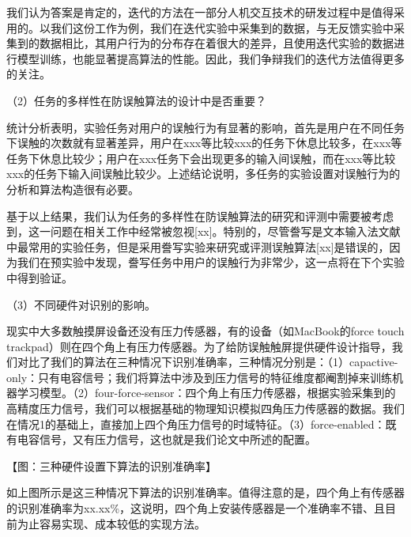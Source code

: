 我们认为答案是肯定的，迭代的方法在一部分人机交互技术的研发过程中是值得采用的。以我们这份工作为例，我们在迭代实验中采集到的数据，与无反馈实验中采集到的数据相比，其用户行为的分布存在着很大的差异，且使用迭代实验的数据进行模型训练，也能显著提高算法的性能。因此，我们争辩我们的迭代方法值得更多的关注。

（2）任务的多样性在防误触算法的设计中是否重要？

统计分析表明，实验任务对用户的误触行为有显著的影响，首先是用户在不同任务下误触的次数就有显著差异，用户在xxx等比较xxx的任务下休息比较多，在xxx等任务下休息比较少；用户在xxx任务下会出现更多的输入间误触，而在xxx等比较xxx的任务下输入间误触比较少。上述结论说明，多任务的实验设置对误触行为的分析和算法构造很有必要。

基于以上结果，我们认为任务的多样性在防误触算法的研究和评测中需要被考虑到，这一问题在相关工作中经常被忽视[xx]。特别的，尽管誊写是文本输入法文献中最常用的实验任务，但是采用誊写实验来研究或评测误触算法[xx]是错误的，因为我们在预实验中发现，誊写任务中用户的误触行为非常少，这一点将在下个实验中得到验证。

（3）不同硬件对识别的影响。

现实中大多数触摸屏设备还没有压力传感器，有的设备（如MacBook的force touch trackpad）则在四个角上有压力传感器。为了给防误触触屏提供硬件设计指导，我们对比了我们的算法在三种情况下识别准确率，三种情况分别是：（1）capactive-only：只有电容信号；我们将算法中涉及到压力信号的特征维度都阉割掉来训练机器学习模型。（2）four-force-sensor：四个角上有压力传感器，根据实验采集到的高精度压力信号，我们可以根据基础的物理知识模拟四角压力传感器的数据。我们在情况1的基础上，直接加上四个角压力信号的时域特征。（3）force-enabled：既有电容信号，又有压力信号，这也就是我们论文中所述的配置。

【图：三种硬件设置下算法的识别准确率】

如上图所示是这三种情况下算法的识别准确率。值得注意的是，四个角上有传感器的识别准确率为xx.xx\%，这说明，四个角上安装传感器是一个准确率不错、且目前为止容易实现、成本较低的实现方法。

